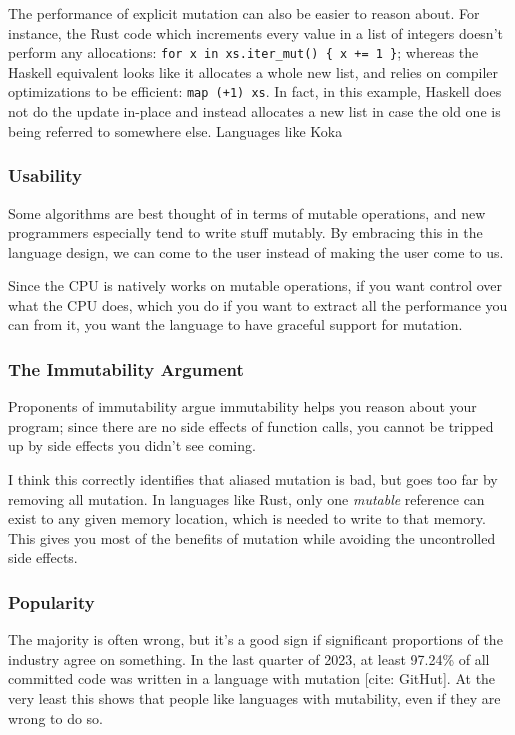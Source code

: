 \documentclass[12pt,twoside]{report}
\begin{document}
The performance of explicit mutation can also be easier to reason about. For instance, the Rust code which increments every value in a list of integers doesn't perform any allocations: \verb|for x in xs.iter_mut() { x += 1 }|; whereas the Haskell equivalent looks like it allocates a whole new list, and relies on compiler optimizations to be efficient: \verb|map (+1) xs|. In fact, in this example, Haskell does not do the update in-place and instead allocates a new list in case the old one is being referred to somewhere else. Languages like Koka

\subsubsection{Usability}
Some algorithms are best thought of in terms of mutable operations, and new programmers especially tend to write stuff mutably. By embracing this in the language design, we can come to the user instead of making the user come to us.

Since the CPU is natively works on mutable operations, if you want control over what the CPU does, which you do if you want to extract all the performance you can from it, you want the language to have graceful support for mutation.

\subsubsection{The Immutability Argument}
Proponents of immutability argue immutability helps you reason about your program; since there are no side effects of function calls, you cannot be tripped up by side effects you didn't see coming.

I think this correctly identifies that aliased mutation is bad, but goes too far by removing all mutation. In languages like Rust, only one \textit{mutable} reference can exist to any given memory location, which is needed to write to that memory. This gives you most of the benefits of mutation while avoiding the uncontrolled side effects.

\subsubsection{Popularity}
The majority is often wrong, but it's a good sign if significant proportions of the industry agree on something. In the last quarter of 2023, at least 97.24\% of all committed code was written in a language with mutation [cite: GitHut]. At the very least this shows that people like languages with mutability, even if they are wrong to do so.
\end{document}
